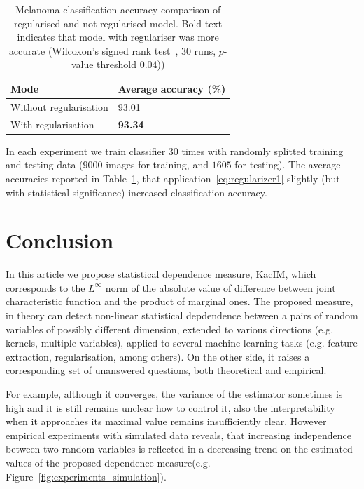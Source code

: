 \documentclass{article}
\begin{document}
\begin{table}	
	\centering
	\begin{tabular}{ |p{4cm}|p{3cm}|}
		\hline
		Mode & Average accuracy (\%)  \\
		\hline
		Without regularisation   &   93.01 \\		
		\hline
		With regularisation  &   \textbf{93.34} \\		
		\hline
	\end{tabular}
	\caption{Melanoma classification accuracy comparison of regularised and not regularised model. Bold text indicates that model with regulariser was more accurate (Wilcoxon's signed rank test~\cite{Wilcoxon1992}, 30 runs, $p$-value threshold $0.04$))}
	\label{table:regularisation_classification_accuracies}	
\end{table}


In each experiment we train classifier $30$ times with randomly splitted training and testing data ($9000$ images for training, and $1605$ for testing). The average accuracies reported in Table~\ref{table:regularisation_classification_accuracies}, that application~\eqref{eq:regularizer1} slightly (but with statistical significance) increased classification accuracy.

\section{Conclusion} 

\label{section:conclusion}
In this article we propose statistical dependence measure, KacIM, which corresponds to the $L^{\infty}$ norm of the absolute value of difference between joint characteristic function and the product of marginal ones. The proposed measure, in theory can detect non-linear statistical depdendence between a pairs of random variables of possibly different dimension, extended to various directions (e.g. kernels, multiple variables), applied to several machine learning tasks (e.g. feature extraction, regularisation, among others). On the other side, it raises a corresponding set of unanswered questions, both theoretical and empirical. 

For example, although it converges, the variance of the estimator sometimes is high and it is still remains unclear how to control it, also the interpretability when it approaches its maximal value remains insufficiently clear. However empirical experiments with simulated data reveals, that increasing independence between two random variables is reflected in a decreasing trend on the estimated values of the proposed dependence measure(e.g. Figure~\ref{fig:experiments_simulation}). 
\end{document}
